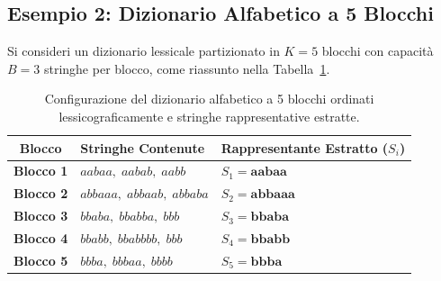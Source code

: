 \FloatBarrier
\subsection{Esempio 2: Dizionario Alfabetico a 5 Blocchi}
\label{subsec:esempio-alfabetico-5-blocchi}

Si consideri un dizionario lessicale partizionato in $K = 5$ blocchi con capacit\`a $B = 3$ stringhe per blocco, come riassunto nella Tabella~\ref{tab:dizionario-5-blocchi}.

\begin{table}[H]
\centering
\small
\begin{tabular}{c l l}
\toprule
\textbf{Blocco} & \textbf{Stringhe Contenute} & \textbf{Rappresentante Estratto ($S_i$)} \\
\midrule
\textbf{Blocco 1} & $aabaa, \; aabab, \; aabb$ & $S_1 = \mathbf{aabaa}$ \\
\textbf{Blocco 2} & $abbaaa, \; abbaab, \; abbaba$ & $S_2 = \mathbf{abbaaa}$ \\
\textbf{Blocco 3} & $bbaba, \; bbabba, \; bbb$ & $S_3 = \mathbf{bbaba}$ \\
\textbf{Blocco 4} & $bbabb, \; bbabbbb, \; bbb$ & $S_4 = \mathbf{bbabb}$ \\
\textbf{Blocco 5} & $bbba, \; bbbaa, \; bbbb$ & $S_5 = \mathbf{bbba}$ \\
\bottomrule
\end{tabular}
\caption{Configurazione del dizionario alfabetico a 5 blocchi ordinati lessicograficamente e stringhe rappresentative estratte.}
\label{tab:dizionario-5-blocchi}
\end{table}

